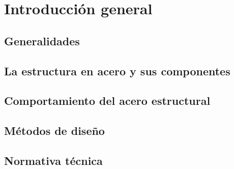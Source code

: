 %
%
\chapter{Introducción general}

\section{Generalidades}
\section{La estructura en acero y sus componentes}
\section{Comportamiento del acero estructural}
\section{Métodos de diseño}
\section{Normativa técnica}
